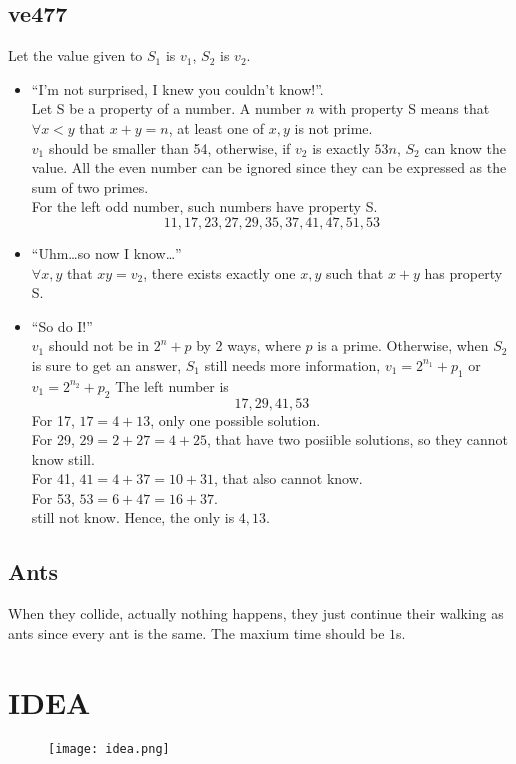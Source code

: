 \documentclass[12pt,a4paper]{article}
\theoremstyle{definition}
\begin{document}
\subsection{ve477}
Let the value given to $S_1$ is $v_1$, $S_2$ is $v_2$.
\begin{itemize}
  \item “I’m not surprised, I knew you couldn’t know!”. \\ Let S be a property of a number. A number $n$ with property S means that $\forall x<y$ that $x+y=n$, at least one of $x,y$ is not prime. \\ $v_1$ should be smaller than 54, otherwise, if $v_2$ is exactly $53n$, $S_2$ can know the value. All the even number can be ignored since they can be expressed as the sum of two primes. \\ For the left odd number, such numbers have property S.
  $$
    11,17,23,27,29,35,37,41,47,51,53
  $$
  \item “Uhm…so now I know…” \\
  $\forall x,y$ that $xy=v_2$, there exists exactly one $x,y$ such that $x+y$ has property S.
  \item “So do I!” \\ $v_1$ should not be in $2^n+p$ by 2 ways, where $p$ is a prime. Otherwise, when $S_2$ is sure to get an answer, $S_1$ still needs more information, $v_1=2^{n_1}+p_1$ or $v_1=2^{n_2}+p_2$
  The left number is 
  $$
    17,29,41,53
  $$
  For 17, $17=4+13$, only one possible solution.\\
  For 29, $29=2+27=4+25$, that have two posiible solutions, so they cannot know still. \\
  For 41, $41=4+37=10+31$, that also cannot know. \\
  For 53, $53=6+47=16+37$. \\ still not know.
  Hence, the only is $4,13$.
\end{itemize}
\subsection{Ants}
When they collide, actually nothing happens, they just continue their walking as ants since every ant is the same. The maxium time should be $1$s.

\section{IDEA}
\begin{figure}[h]
  \centering
  \texttt{[image: idea.png]}
  
\end{figure}
\end{document}
